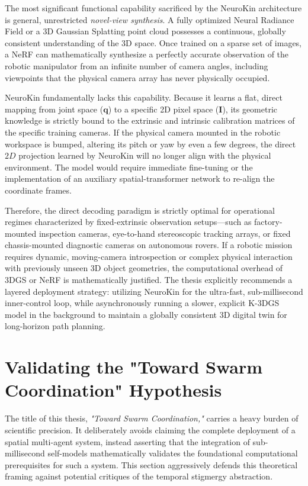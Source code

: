 \documentclass[12pt,a4paper,oneside]{report}
\begin{document}
The most significant functional capability sacrificed by the NeuroKin architecture is general, unrestricted \textit{novel-view synthesis}. A fully optimized Neural Radiance Field or a 3D Gaussian Splatting point cloud possesses a continuous, globally consistent understanding of the 3D space. Once trained on a sparse set of images, a NeRF can mathematically synthesize a perfectly accurate observation of the robotic manipulator from an infinite number of camera angles, including viewpoints that the physical camera array has never physically occupied.

NeuroKin fundamentally lacks this capability. Because it learns a flat, direct mapping from joint space ($\mathbf{q}$) to a specific 2D pixel space ($\mathbf{I}$), its geometric knowledge is strictly bound to the extrinsic and intrinsic calibration matrices of the specific training cameras. If the physical camera mounted in the robotic workspace is bumped, altering its pitch or yaw by even a few degrees, the direct $2D$ projection learned by NeuroKin will no longer align with the physical environment. The model would require immediate fine-tuning or the implementation of an auxiliary spatial-transformer network to re-align the coordinate frames.

Therefore, the direct decoding paradigm is strictly optimal for operational regimes characterized by fixed-extrinsic observation setups—such as factory-mounted inspection cameras, eye-to-hand stereoscopic tracking arrays, or fixed chassis-mounted diagnostic cameras on autonomous rovers. If a robotic mission requires dynamic, moving-camera introspection or complex physical interaction with previously unseen 3D object geometries, the computational overhead of 3DGS or NeRF is mathematically justified. The thesis explicitly recommends a layered deployment strategy: utilizing NeuroKin for the ultra-fast, sub-millisecond inner-control loop, while asynchronously running a slower, explicit K-3DGS model in the background to maintain a globally consistent 3D digital twin for long-horizon path planning.

\section{Validating the "Toward Swarm Coordination" Hypothesis}

The title of this thesis, \textit{"Toward Swarm Coordination,"} carries a heavy burden of scientific precision. It deliberately avoids claiming the complete deployment of a spatial multi-agent system, instead asserting that the integration of sub-millisecond self-models mathematically validates the foundational computational prerequisites for such a system. This section aggressively defends this theoretical framing against potential critiques of the temporal stigmergy abstraction.
\end{document}
